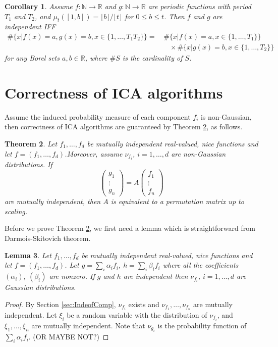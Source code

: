 \documentclass[english]{article} %
\newcommand{\real}{\mathbb{R}}
\renewcommand{\natural}{\mathbb{N}}
\newtheorem{lemma}{Lemma}[section]
\newtheorem{thm}[lemma]{Theorem}
\newtheorem{cor}[lemma]{Corollary}
\theoremstyle{definition}
\begin{document}
\begin{cor}
Assume $f:\natural \rightarrow\real$ and $g:\natural \rightarrow\real$ are periodic functions with period $T_1$ and $T_2$, 
and $\mu_t([1,b]) = \lfloor b\rfloor/\lfloor t\rfloor$ for $0\le b\le t$.  
Then $f$ and $g$ are independent IFF 
\begin{align*}
\#\big\{x\vert f(x) = a, g(x) = b, x\in \{1,\ldots,T_1T_2\} \big\} = & \, \#\big\{x\vert f(x) = a, x\in \{1,\ldots,T_1\} \big\} \\
& \quad \times \#\big\{x\vert g(x) = b, x\in \{1,\ldots,T_2\} \big\} 
\end{align*}
for any Borel sets $a,b\in \real$, where $\#S$ is the cardinality of $S$.
\end{cor}


\section{Correctness of ICA algorithms}
Assume the induced probability measure of each component $f_i$ is non-Gaussian, then correctness of ICA algorithms are guaranteed by Theorem \ref{thm:CorofICA}, as follows.
\begin{thm}
\label{thm:CorofICA}
Let $f_1,\ldots,f_d$ be mutually independent real-valued, nice functions and let $f = (f_1,\ldots,f_d)$.Moreover, assume $\nu_{f_i}$, $i=1,\ldots,d$ are non-Gaussian distributions. If
\begin{equation}
\left(
\begin{array}{ccc}
g_1 \\
\vdots \\
g_n
\end{array}
\right) = A
\left(
\begin{array}{ccc}
f_1 \\
\vdots \\
f_n
\end{array}
\right)
\end{equation}
are mutually independent, then $A$ is equivalent to a permutation matrix up to scaling.
\end{thm}

Before we prove Theorem \ref{thm:CorofICA}, we first need a lemma which is straightforward from Darmois-Skitovich theorem.
\begin{lemma}
Let $f_1,\ldots,f_d$ be mutually independent real-valued, nice functions and let $f = (f_1,\ldots,f_d)$.
Let $g = \sum_i \alpha_i f_i$, $h = \sum_i \beta_i f_i$ where all the coefficients $(\alpha_i)$, $(\beta_i)$ are nonzero.
If $g$ and $h$ are independent then $\nu_{f_i}$, $i=1,\ldots,d$ are Gaussian distributions.
\end{lemma}
\begin{proof}
By Section \ref{sec:IndeofComp}, $\nu_{f_i}$ exists and $\nu_{f_1},\ldots,\nu_{f_n}$ are mutually independent. 
Let $\xi_i$ be a random variable with the distribution of $\nu_{f_i}$, and  $\xi_1,\ldots,\xi_n$ are mutually independent. Note that $\nu_{g_i}$ is the probability function of $\sum_{i}\alpha_if_i$. (OR MAYBE NOT?) 
\end{proof}
\end{document}
